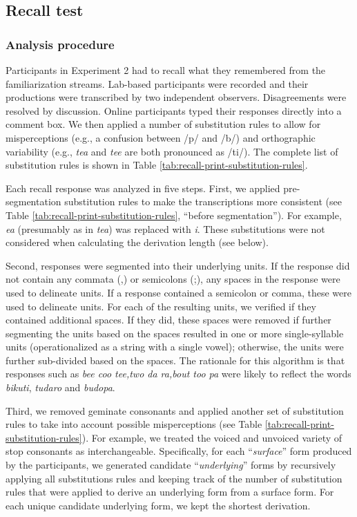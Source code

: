\documentclass[]{article}
\begin{document}
\subsection{Recall test}\label{app:recall_analysis}

\subsubsection{Analysis procedure}\label{app:recall_analysis_steps}

Participants in Experiment 2 had to recall what they remembered from the familiarization streams. Lab-based participants were recorded and their productions were transcribed by two independent observers. Disagreements were resolved by discussion. Online participants typed their responses directly into a comment box. We then applied a number of substitution rules to allow for misperceptions (e.g., a confusion between /p/ and /b/) and orthographic variability (e.g., \emph{tea} and \emph{tee} are both pronounced as /ti/). The complete list of substitution rules is shown in Table \ref{tab:recall-print-substitution-rules}.

Each recall response was analyzed in five steps. First, we applied pre-segmentation substitution rules to make the transcriptions more consistent (see Table \ref{tab:recall-print-substitution-rules}, ``before segmentation''). For example, \emph{ea} (presumably as in \emph{tea}) was replaced with \emph{i}. These substitutions were not considered when calculating the derivation length (see below).

Second, responses were segmented into their underlying units. If the response did not contain any commata (,) or semicolons (;), any spaces in the response were used to delineate units. If a response contained a semicolon or comma, these were used to delineate units. For each of the resulting units, we verified if they contained additional spaces. If they did, these spaces were removed if further segmenting the units based on the spaces resulted in one or more single-syllable units (operationalized as a string with a single vowel); otherwise, the units were further sub-divided based on the spaces. The rationale for this algorithm is that responses such as \emph{bee coo tee,two da ra,bout too pa} were likely to reflect the words \emph{bikuti}, \emph{tudaro} and \emph{budopa}.

Third, we removed geminate consonants and applied another set of substitution rules to take into account possible misperceptions (see Table \ref{tab:recall-print-substitution-rules}). For example, we treated the voiced and unvoiced variety of stop consonants as interchangeable. Specifically, for each ``\emph{surface}'' form produced by the participants, we generated candidate ``\emph{underlying}'' forms by recursively applying all substitutions rules and keeping track of the number of substitution rules that were applied to derive an underlying form from a surface form. For each unique candidate underlying form, we kept the shortest derivation.
\end{document}
